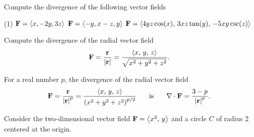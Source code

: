 \documentclass[mathNotesPreamble]{subfiles}
\begin{document}
  \begin{ex*}
    Compute the divergence of the following vector fields
  \end{ex*}
  \begin{tasks}[after-item-skip=\stretch{1}, label=](1)
    \task $\mathbf F={\left\langle x, -2y, 3z \right\rangle}$
    \task $\mathbf F={\left\langle -y, x-z, y \right\rangle}$
    \task $\mathbf F={\left\langle 4yz\cos(x),\,3xz\tan(y),\,-5xy\csc(z) \right\rangle}$
  \end{tasks}
  \pagebreak

  \begin{ex*}
    Compute the divergence of the radial vector field
      \[\mathbf F=\frac{{\mathbf{r}}}{{\left\vert{\mathbf{r}}\right\vert}}=\frac{{\left\langle x,\,y,\,z \right\rangle}}{\sqrt{x^2+y^2+z^2}}.\]
  \end{ex*}

  \begin{thmBox*}
    For a real number $p$, the divergence of the radial vector field
      \[\mathbf F=\frac{{\mathbf{r}}}{{\left\vert{\mathbf{r}}\right\vert}^p}=\frac{{\left\langle x,\,y,\,z \right\rangle}}{{\left(x^2+y^2+z^2\right)}^{p/2}} \hspace*{15pt}\textnormal{ is }\hspace*{15pt} \nabla\cdot\mathbf F= \frac{3-p}{{\left\vert{\mathbf{r}}\right\vert}^p}.\]
  \end{thmBox*}
  \pagebreak

  \begin{ex*}
    Consider the two-dimensional vector field $\mathbf F={\left\langle x^2,\,y \right\rangle}$ and a circle $C$ of radius 2 centered at the origin. 
  \end{ex*}
\end{document}
